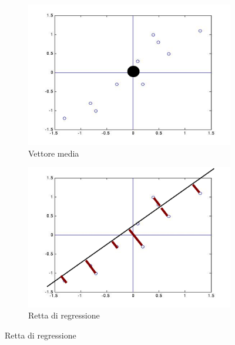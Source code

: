 \documentclass[a4paper,oneside,titlepage]{book}
\begin{document}
\begin{figure}[htp]
	\begin{subfigure}{0.49\textwidth}
	    \centering
		\includegraphics[width=\textwidth, height=\textheight, keepaspectratio]{vettore-media.png}
		\caption{Vettore media}
	\end{subfigure}
	\hfill
	\begin{subfigure}{0.49\textwidth}
	    \centering
		\includegraphics[width=\textwidth, height=\textheight, keepaspectratio]{regressione.png}
		\caption{Retta di regressione}
	\end{subfigure}
\end{figure}
\end{document}
